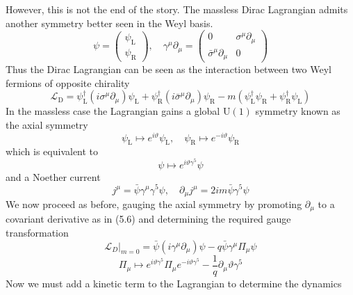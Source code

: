 \documentclass[11pt, a4paper]{article}
\theoremstyle{definition}
\theoremstyle{plain}
\begin{document}
However, this is not the end of the story. The massless Dirac Lagrangian admits
another symmetry better seen in the Weyl basis.
\begin{equation}
  \psi =
  \begin{pmatrix} \psi_\mathrm{L} \\ \psi_\mathrm{R} \end{pmatrix}, \quad
  \gamma^{\mu}\partial_\mu =
  \begin{pmatrix}0 & \sigma^\mu\partial_\mu \\ \bar{\sigma}^{\mu}\partial_\mu & 0 \end{pmatrix}
\end{equation}
Thus the Dirac Lagrangian can be seen as the interaction between two Weyl fermions
of opposite chirality
\begin{equation}
  \mathcal{L}_\mathrm{D} = \psi_\mathrm{L}^{\dagger}(i\sigma^\mu\partial_\mu)\psi_\mathrm{L} +
  \psi_\mathrm{R}^{\dagger}(i\bar{\sigma}^\mu\partial_\mu)\psi_\mathrm{R}
  - m(\psi_\mathrm{L}^{\dagger}\psi_\mathrm{R} + \psi_\mathrm{R}^{\dagger}\psi_\mathrm{L})
\end{equation}
In the massless case the Lagrangian gains a global $\mathrm{U}(1)$ symmetry
known as the axial symmetry
\begin{equation}
  \psi_\mathrm{L} \mapsto e^{i\vartheta}\psi_\mathrm{L}, \quad
  \psi_\mathrm{R} \mapsto e^{-i\vartheta}\psi_\mathrm{R}
\end{equation}
which is equivalent to 
\begin{equation}
  \psi \mapsto e^{i\vartheta\gamma^5}\psi
\end{equation}
and a Noether current
\begin{equation}
  j^\mu = \bar{\psi}\gamma^\mu\gamma^5\psi, \quad \partial_\mu j^\mu = 2im\bar{\psi}\gamma^5\psi
\end{equation}
We now proceed as before, gauging the axial symmetry by promoting $\partial_\mu$
to a covariant derivative as in (5.6) and determining the required gauge transformation
\begin{equation}
  {\mathcal{L}_{D}|}_{m=0} = \bar{\psi}(i\gamma^\mu \partial_\mu)\psi
  - q\bar{\psi}\gamma^\mu\Pi_\mu\psi
\end{equation}
\begin{equation}
  \Pi_\mu \mapsto e^{i\vartheta\gamma^5}\Pi_\mu e^{-i\vartheta\gamma^5} 
  - \frac{1}{q}\partial_\mu\vartheta\gamma^5
\end{equation}
Now we must add a kinetic term to the Lagrangian to determine the dynamics 
\end{document}
